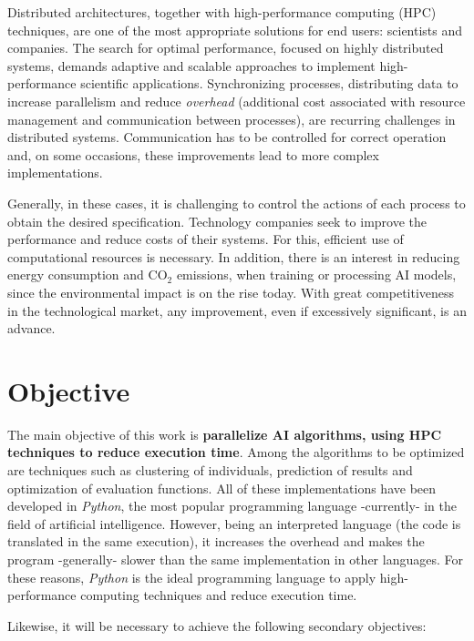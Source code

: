 	Distributed architectures, together with high-performance computing (HPC) techniques, are one of the most appropriate solutions for end users: scientists and companies. The search for optimal performance, focused on highly distributed systems, demands adaptive and scalable approaches to implement high-performance scientific applications. Synchronizing processes, distributing data to increase parallelism and reduce \textit{overhead} (additional cost associated with resource management and communication between processes), are recurring challenges in distributed systems. Communication has to be controlled for correct operation and, on some occasions, these improvements lead to more complex implementations.
	
	Generally, in these cases, it is challenging to control the actions of each process to obtain the desired specification. Technology companies seek to improve the performance and reduce costs of their systems. For this, efficient use of computational resources is necessary. In addition, there is an interest in reducing energy consumption and CO\(_2\) emissions, when training or processing AI models, since the environmental impact is on the rise today. With great competitiveness in the technological market, any improvement, even if excessively significant, is an advance.


\section{Objective}

	
	The main objective of this work is \textbf{parallelize AI algorithms, using HPC techniques to reduce execution time}. Among the algorithms to be optimized are techniques such as clustering of individuals, prediction of results and optimization of evaluation functions. All of these implementations have been developed in \textit{Python}, the most popular programming language -currently- in the field of artificial intelligence\cite{sainin2021best}. However, being an interpreted language (the code is translated in the same execution), it increases the overhead and makes the program -generally- slower than the same implementation in other languages. For these reasons, \textit{Python} is the ideal programming language to apply high-performance computing techniques and reduce execution time.
	
	Likewise, it will be necessary to achieve the following secondary objectives:
	
